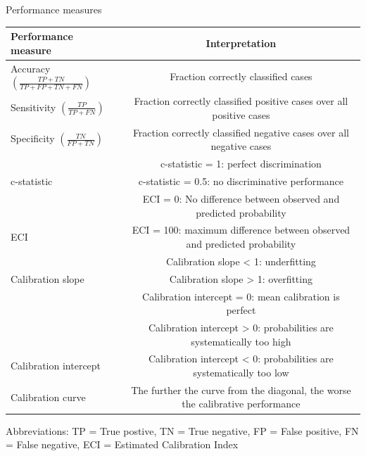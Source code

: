 \documentclass[AMA,STIX1COL, table]{WileyNJD-v2}
\begin{document}
\FloatBarrier
\begin{center}
\begin{threeparttable}[hbt!]
\renewcommand{\arraystretch}{1.5}

\centering
\caption{Performance measures\label{tab1}}%
\begin{tabular*}{454}{lc}%
\toprule
\textbf{Performance measure} & \textbf{Interpretation}\\
\midrule
Accuracy $\left(\frac{TP + TN}{TP + FP + TN + FN}\right)$ & Fraction correctly classified cases \\
Sensitivity $\left(\frac{TP}{TP + FN}\right)$ & Fraction correctly classified positive cases over all positive cases \\
Specificity $\left(\frac{TN}{FP + TN}\right)$ & Fraction correctly classified negative cases over all negative cases \\
& c-statistic = 1: perfect discrimination \\
\multirow{-2}{4em}{\cellcolor{gray!25}c-statistic} & \cellcolor{gray!25}c-statistic = 0.5: no discriminative performance \\
\cellcolor{white}& \cellcolor{white} ECI = 0: No difference between observed and predicted probability\\
\multirow{-2}{4em}{ECI} & ECI = 100: maximum difference between observed and predicted probability\\
& Calibration slope < 1: underfitting \\
\multirow{-2}{4em}{\cellcolor{gray!25}Calibration slope} & \cellcolor{gray!25}Calibration slope > 1: overfitting \\
\cellcolor{white}& \cellcolor{white}Calibration intercept = 0: mean calibration is perfect\\
& Calibration intercept > 0: probabilities are systematically too high\\
\multirow{-3}{4em}{\cellcolor{white}Calibration intercept} & \cellcolor{white}Calibration intercept < 0: probabilities are systematically too low\\
\cellcolor{gray!25}Calibration curve & \cellcolor{gray!25}The further the curve from the diagonal, the worse the calibrative performance \\
\bottomrule
\end{tabular*}
\begin{tablenotes}%
\item Abbreviations: TP = True postive, TN = True negative, FP = False positive, FN = False negative, ECI = Estimated Calibration Index
\end{tablenotes}
\end{threeparttable}
\end{center}
\FloatBarrier
\end{document}
